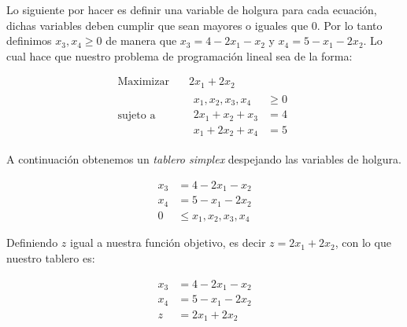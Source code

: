 \documentclass{article}
\begin{document}
 Lo siguiente por hacer es definir una variable de holgura para cada
 ecuación, dichas variables deben cumplir que sean mayores o iguales
 que 0.
 Por lo tanto definimos $x_3,x_4\geq 0$ de manera que $x_3 = 4-2x_1-x_2$ y
 $x_4 = 5-x_1-2x_2 $.
 Lo cual hace que nuestro problema de programación lineal sea de la
 forma:

  \begin{equation*}
   \begin{aligned}
   \text{Maximizar} \quad & 2x_{1}+2x_{2}\\
   \text{sujeto a} \quad &
     \begin{aligned}
      x_{1},x_{2},x_3,x_4 &\geq  0\\
      2x_{1}+x_{2}+x_3 &= 4\\
      x_{1}+2x_{2}+x_4 &= 5
     \end{aligned}
   \end{aligned}
 \end{equation*}

 A continuación obtenemos un \emph{tablero simplex} despejando las
 variables de holgura.

    \begin{equation*}
     \begin{aligned}
      x_3 &= 4-2x_1-x_2 \\
      x_4 &= 5-x_1-2x_2\\
      0 &\leq x_{1},x_{2},x_3,x_4
     \end{aligned}
 \end{equation*}

Definiendo $z$ igual a nuestra función objetivo, es decir $z =
2x_1+2x_2$, con lo que nuestro tablero es:
 
   \begin{equation*}
     \begin{aligned}
      x_3 &= 4-2x_1-x_2 \\
      x_4 &= 5-x_1-2x_2\\
      \hline
      z &= 2x_1+2x_2
     \end{aligned}
 \end{equation*}
\end{document}
